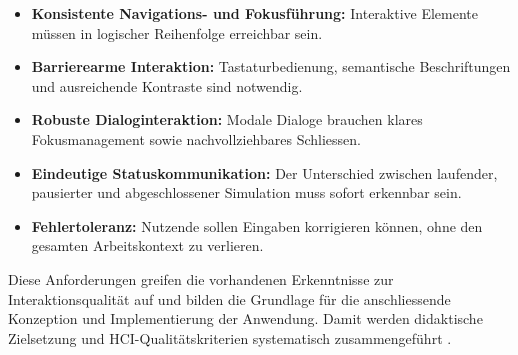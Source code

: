 \begin{itemize}
    \item \textbf{Konsistente Navigations- und Fokusführung:} Interaktive Elemente müssen in logischer Reihenfolge erreichbar sein.
    \item \textbf{Barrierearme Interaktion:} Tastaturbedienung, semantische Beschriftungen und ausreichende Kontraste sind notwendig.
    \item \textbf{Robuste Dialoginteraktion:} Modale Dialoge brauchen klares Fokusmanagement sowie nachvollziehbares Schliessen.
    \item \textbf{Eindeutige Statuskommunikation:} Der Unterschied zwischen laufender, pausierter und abgeschlossener Simulation muss sofort erkennbar sein.
    \item \textbf{Fehlertoleranz:} Nutzende sollen Eingaben korrigieren können, ohne den gesamten Arbeitskontext zu verlieren.
\end{itemize}

Diese Anforderungen greifen die vorhandenen Erkenntnisse zur Interaktionsqualität auf und bilden die Grundlage für die anschliessende Konzeption und Implementierung der Anwendung. Damit werden didaktische Zielsetzung und HCI-Qualitätskriterien systematisch zusammengeführt \cite{hundhausen2002meta,wcag2018}.
